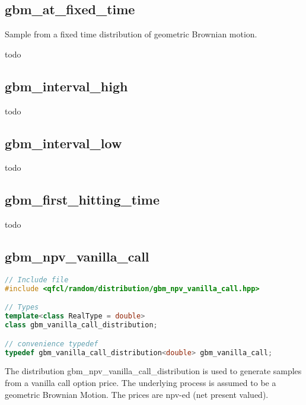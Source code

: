\subsection{gbm\_at\_fixed\_time}
Sample from a fixed time distribution of geometric Brownian motion. 

todo

\subsection{gbm\_interval\_high}
todo
\subsection{gbm\_interval\_low}
todo
\subsection{gbm\_first\_hitting\_time}
todo

\subsection{gbm\_npv\_vanilla\_call}

%
\begin{lstlisting}[language=C++]
// Include file
#include <qfcl/random/distribution/gbm_npv_vanilla_call.hpp>

// Types
template<class RealType = double> 
class gbm_vanilla_call_distribution;

// convenience typedef
typedef gbm_vanilla_call_distribution<double> gbm_vanilla_call;

\end{lstlisting}

%
The distribution gbm\_npv\_vanilla\_call\_distribution is used to generate samples
from a vanilla call option price. The underlying process is assumed to be a geometric Brownian Motion. 
The prices are npv-ed (net present valued).

